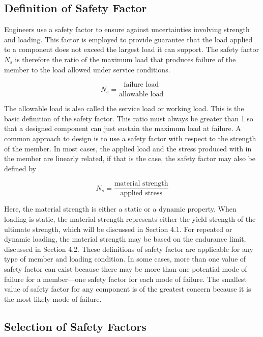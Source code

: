 \documentclass[
10pt,
a4paper,
openany,
svgnames,
]{book}
\begin{document}
\subsection{Definition of Safety Factor}

Engineers use a safety factor to ensure against uncertainties involving strength and loading. This factor is employed to provide guarantee that the load applied to a component does not exceed the largest load it can support. The safety factor $N_s$ is therefore the ratio of the maximum load that produces failure of the member to the load allowed under service conditions.

\begin{equation}
  N_s = \frac{\text{failure load}}{\text{allowable load}}
\end{equation}

The allowable load is also called the service load or working load. This is the basic definition of the safety factor. This ratio must always be greater than 1 so that a designed component can just sustain the maximum load at failure.
A common approach to design is to use a safety factor with respect to the strength of the member. In most cases, the applied load and the stress produced with in the member are linearly related, if that is the case, the safety factor may also be defined by

\begin{equation}
  N_s = \frac{\text{material strength}}{\text{applied stress}}
\end{equation}

Here, the material strength is either a static or a dynamic property. When loading is static, the material strength represents either the yield strength of the ultimate strength, which will be discussed in Section 4.1. For repeated or dynamic loading, the material strength may be based on the endurance limit, discussed in Section 4.2. These definitions of safety factor are applicable for any type of member and loading condition. In some cases, more than one value of safety factor can exist because there may be more than one potential mode of failure for a member—one safety factor for each mode of failure. The smallest value of safety factor for any component is of the greatest concern because it is the most likely mode of failure.

\subsection{Selection of Safety Factors}
\end{document}
